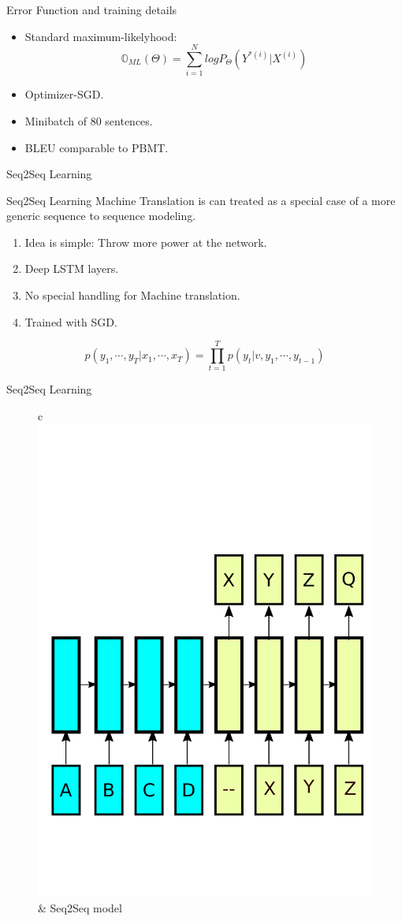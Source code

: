 ﻿\documentclass[table,aspectratio=43,mathserif,xcolor={usenames,dvipsnames,svgnames,table},10pt]{beamer}
\renewcommand{\footnotesize}{\tiny}
\begin{document}
\begin{frame}{Error Function and training details}
 \begin{itemize}
 \item<+-> Standard maximum-likelyhood:
 $$\mathbb{O}_{ML}(\Theta) = \sum_{i=1}^N log P_\Theta(Y^{*(i)} | X^{(i)}) $$
 \item<+-> Optimizer-SGD.
 \item<+-> Minibatch of 80 sentences. 
 \item<+-> BLEU comparable to PBMT.
 \end{itemize}
\end{frame}

\begin{section}{Seq2Seq Learning}
\end{section}

\begin{frame}{Seq2Seq Learning}
 Machine Translation is can treated as a special case of a more generic sequence to sequence modeling.
 \begin{enumerate}
  \item<+-> Idea is simple: Throw more power at the network.
  \item<+-> Deep LSTM layers.
  \item<+-> No special handling for Machine translation.
  \item<+-> Trained with SGD.
 \end{enumerate}
$$ p(y_1, \cdots, y_T| x_1, \cdots, x_T) = \prod_{t=1}^{T} p(y_t| v, y_1, \cdots, y_{t-1})$$
\end{frame}


\begin{frame}{Seq2Seq Learning}
 \begin{figure}
    \centering
    \begin{tabular}{c}
	\includegraphics[width=.49\linewidth]{images/seq2seq.pdf} &
	\footnotesize Seq2Seq model \\
    \end{tabular}
    \end{figure}
\end{frame}
\end{document}
